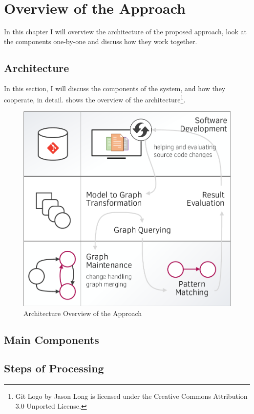\chapter{Overview of the Approach}
\label{chap:overview-of-the-approach}

In this chapter I will overview the architecture of the proposed approach, look at the components one-by-one and discuss how they work together.

\section{Architecture}
\label{sect:architecture}

In this section, I will discuss the components of the system, and how they cooperate,
in detail.  shows the overview of the architecture\footnote{Git Logo by Jason Long is licensed under the Creative Commons Attribution 3.0 Unported License.}.

\begin{figure}[!htb]
  \centering
  \includegraphics[width=\textwidth]{include/figures/architecture.pdf}
  \caption{Architecture Overview of the Approach}
  \label{fig:architecture-overview}
\end{figure}

\section{Main Components}

\section{Steps of Processing}
